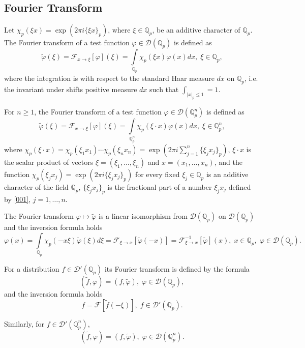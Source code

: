\documentclass[14pt]{article}
\theoremstyle{theorem}
\theoremstyle{theorem}
\theoremstyle{definition}
\theoremstyle{lemma}
\numberwithin{equation}{section}
\begin{document}
\subsection{Fourier Transform}

Let $\chi_p(\xi x)=\exp(2\pi i\{\xi x\}_p)$, where $\xi\in\mathbb{Q}_p$, be an additive character of $\mathbb{Q}_p$. The Fourier transform of a test function $\varphi\in\mathcal{D}(\mathbb{Q}_p)$ is defined as
$$\widetilde{\varphi}(\xi)=\mathcal{F}_{x\to\xi}[\varphi](\xi)=\int\limits_{\mathbb{Q}_p}\chi_p(\xi x)\varphi(x)dx,\;\xi\in\mathbb{Q}_p,$$
where the integration is with respect to the standard Haar measure $dx$ on $\mathbb{Q}_p$, i.e. the invariant under shifts positive measure $dx$ such that $\int_{|x|_p\leq1}=1$.

For $n\geq1$, the Fourier transform of a test function $\varphi\in\mathcal{D}(\mathbb{Q}_p^n)$ is defined as
$$\widetilde{\varphi}(\xi)=\mathcal{F}_{x\to\xi}[\varphi](\xi)=\int\limits_{\mathbb{Q}_p^n}\chi_p(\xi\cdot x)\varphi(x)dx,\;\xi\in\mathbb{Q}_p^n,$$
where $\chi_p(\xi\cdot x)=\chi_p(\xi_1 x_1)\cdots\chi_p(\xi_n x_n)=\exp\left(2\pi i\sum\limits_{j=1}^n\{\xi_j x_j\}_p\right)$, $\xi\cdot x$ is the scalar product of vectors $\xi=(\xi_1,\dots,\xi_n)$ and $x=(x_1,\dots,x_n)$, and the function $\chi_p(\xi_jx_j)=\exp\left(2\pi i\{\xi_j x_j\}_p\right)$ for every fixed $\xi_j\in\mathbb{Q}_p$ is an additive character of the field $\mathbb{Q}_p$, $\{\xi_jx_j\}_p$ is the fractional part of a number $\xi_jx_j$ defined by \eqref{001}, $j=1,\dots,n$.

The Fourier transform $\varphi\mapsto\widetilde{\varphi}$ is a linear isomorphism from $\mathcal{D}(\mathbb{Q}_p)$ on $\mathcal{D}(\mathbb{Q}_p)$ and the inversion formula holds
$$\varphi(x)=\int\limits_{\mathbb{Q}_p}\chi_p(-x\xi)\widetilde{\varphi}(\xi)d\xi=\mathcal{F}_{\xi\to x}\left[\widetilde{\varphi}(-x)\right]=\mathcal{F}_{\xi\to x}^{-1}\left[\widetilde{\varphi}\right](x),\;x\in\mathbb{Q}_p,\;\varphi\in\mathcal{D}(\mathbb{Q}_p).$$

For a distribution $f\in\mathcal{D}'(\mathbb{Q}_p)$ its Fourier transform is defined by the formula
$$(\widetilde{f},\varphi)=(f,\widetilde{\varphi}),\;\varphi\in\mathcal{D}(\mathbb{Q}_p),$$
and the inversion formula holds
$$f=\mathcal{F}\left[\widetilde{f}(-\xi)\right],\;f\in\mathcal{D}'(\mathbb{Q}_p).$$

Similarly, for $f\in\mathcal{D}'(\mathbb{Q}_p^n)$,
$$(\widetilde{f},\varphi)=(f,\widetilde{\varphi}),\;\varphi\in\mathcal{D}(\mathbb{Q}_p^n).$$
\end{document}

